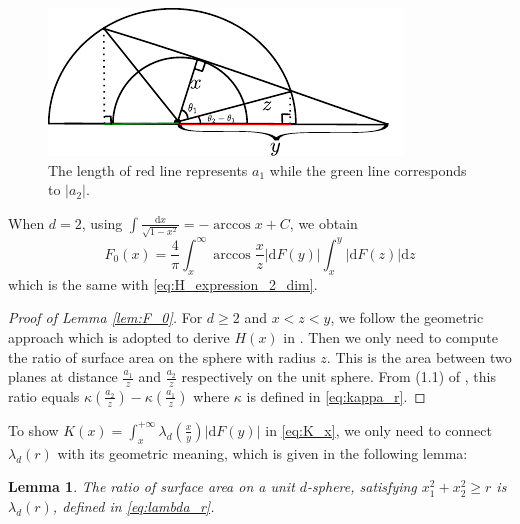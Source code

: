 \documentclass[conference,a4paper]{IEEEtran}
\def\d{\mathrm{d}}
\newtheorem{lemma}{Lemma}
\begin{document}
\begin{figure}[!ht]
     \centering
     \includegraphics[width=0.8\linewidth]{dessin.pdf}
     \caption{The length of red line represents $a_1$ while the green line corresponds to $|a_2|$.}
     \label{fig:a1a2}
\end{figure}
When $d=2$, using $\int \frac{\d x}{\sqrt{1-x^2}} = -\arccos x + C$,
we obtain
$$
F_0(x)=\frac{4}{\pi} \int_x^{\infty} \arccos\frac{x}{z}|\d F(y)|
\int_x^{y} |\d F(z)|\d z
$$
which is the same with \eqref{eq:H_expression_2_dim}.
\begin{proof}[Proof of Lemma \ref{lem:F_0}]
For $d\geq 2$ and $x<z<y$, we follow the geometric approach
which is adopted to derive
$H(x)$ in \cite{carnal1970konvexe}.
Then we only need to compute the ratio of surface area
on the sphere with radius $z$. This is the area between
two planes at distance $\frac{a_1}{z}$ and $\frac{a_2}{z}$
respectively on the unit sphere. From (1.1) of \cite{dwyer1991convex},
this ratio equals $\kappa(\frac{a_2}{z}) - \kappa(\frac{a_1}{z})$
where $\kappa$ is defined in \eqref{eq:kappa_r}.

\end{proof}
To show 
$K(x) = \int_x^{+\infty} \lambda_d(\frac{x}{y})|\d F(y)|$
in \eqref{eq:K_x},
we only need to connect $\lambda_d(r)$ with its geometric meaning,
which is given in the following lemma:
\begin{lemma}
     The ratio of surface area on a unit $d$-sphere,
     satisfying $x_1^2+x_2^2\geq r$ is $\lambda_d(r)$,
     defined in \eqref{eq:lambda_r}.
\end{lemma}
\end{document}
